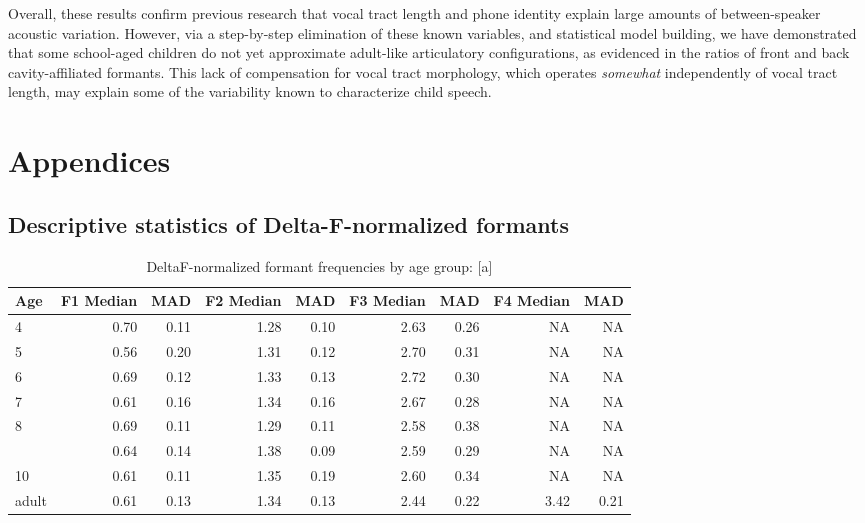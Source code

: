 \documentclass[
]{article}
\begin{document}
Overall, these results confirm previous research that vocal tract length and phone identity explain large amounts of between-speaker acoustic variation. However, via a step-by-step elimination of these known variables, and statistical model building, we have demonstrated that some school-aged children do not yet approximate adult-like articulatory configurations, as evidenced in the ratios of front and back cavity-affiliated formants. This lack of compensation for vocal tract morphology, which operates \emph{somewhat} independently of vocal tract length, may explain some of the variability known to characterize child speech.

\hypertarget{appendices}{%
\section{Appendices}\label{appendices}}

\hypertarget{descriptive-statistics-of-delta-f-normalized-formants}{%
\subsection{Descriptive statistics of Delta-F-normalized formants}\label{descriptive-statistics-of-delta-f-normalized-formants}}

\begin{table}[!h]

\caption{\label{tab:deltaf-measurement-table-a}DeltaF-normalized formant frequencies by age group: [a]}
\centering
\begin{tabular}[t]{lrrrrrrrr}
\toprule
Age & F1 Median & MAD & F2 Median & MAD & F3 Median & MAD & F4 Median & MAD\\
\midrule
4 & 0.70 & 0.11 & 1.28 & 0.10 & 2.63 & 0.26 & NA & NA\\
5 & 0.56 & 0.20 & 1.31 & 0.12 & 2.70 & 0.31 & NA & NA\\
6 & 0.69 & 0.12 & 1.33 & 0.13 & 2.72 & 0.30 & NA & NA\\
7 & 0.61 & 0.16 & 1.34 & 0.16 & 2.67 & 0.28 & NA & NA\\
8 & 0.69 & 0.11 & 1.29 & 0.11 & 2.58 & 0.38 & NA & NA\\
\addlinespace
9 & 0.64 & 0.14 & 1.38 & 0.09 & 2.59 & 0.29 & NA & NA\\
10 & 0.61 & 0.11 & 1.35 & 0.19 & 2.60 & 0.34 & NA & NA\\
adult & 0.61 & 0.13 & 1.34 & 0.13 & 2.44 & 0.22 & 3.42 & 0.21\\
\bottomrule
\end{tabular}
\end{table}
\end{document}
